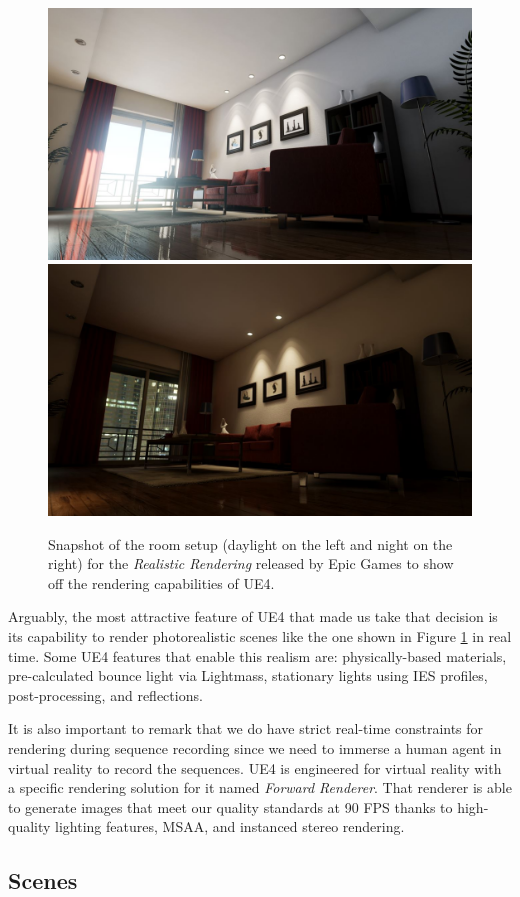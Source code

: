 \begin{figure}[!hbt]
    \centering
    \includegraphics[width=0.495\linewidth]{Figures/Sim2Real/realistic_rendering.jpg}
    \includegraphics[width=0.495\linewidth]{Figures/Sim2Real/realistic_rendering_night.jpg}
    \caption{Snapshot of the room setup (daylight on the left and night on the right) for the \emph{Realistic Rendering} released by Epic Games to show off the rendering capabilities of \ac{UE4}.}
    \label{fig:sim2real:realistic_rendering}
  \end{figure}

Arguably, the most attractive feature of \ac{UE4} that made us take that decision is its capability to render photorealistic scenes like the one shown in Figure \ref{fig:sim2real:realistic_rendering} in real time. Some \ac{UE4} features that enable this realism are: physically-based materials, pre-calculated bounce light via Lightmass, stationary lights using IES profiles, post-processing, and reflections.

It is also important to remark that we do have strict real-time constraints for rendering during sequence recording since we need to immerse a human agent in virtual reality to record the sequences. \ac{UE4} is engineered for virtual reality with a specific rendering solution for it named \emph{Forward Renderer}. That renderer is able to generate images that meet our quality standards at 90 \ac{FPS} thanks to high-quality lighting features, \ac{MSAA}, and instanced stereo rendering.

\subsection{Scenes}

